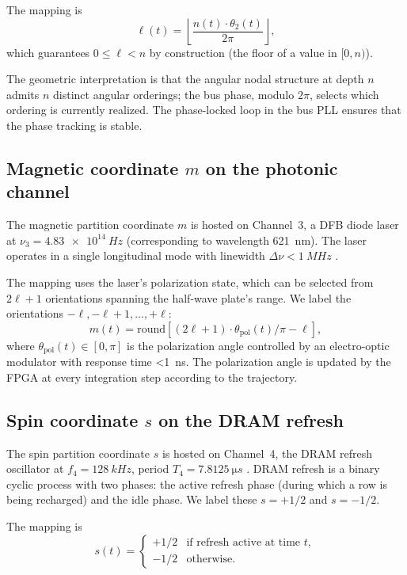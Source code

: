 \documentclass[twocolumn,11pt,a4paper]{article}
\theoremstyle{definition}
\theoremstyle{remark}
\begin{document}
The mapping is
\begin{equation}
    \ell(t) = \left\lfloor \frac{n(t) \cdot \theta_2(t)}{2\pi} \right\rfloor,
    \label{eq:l-map}
\end{equation}
which guarantees $0 \le \ell < n$ by construction (the floor of a value in $[0, n)$).

The geometric interpretation is that the angular nodal structure at depth $n$ admits $n$ distinct angular orderings; the bus phase, modulo $2\pi$, selects which ordering is currently realized. The phase-locked loop in the bus PLL ensures that the phase tracking is stable.

\subsection{Magnetic coordinate $m$ on the photonic channel}

The magnetic partition coordinate $m$ is hosted on Channel~3, a DFB diode laser at $\nu_3 = \SI{4.83e14}{Hz}$ (corresponding to wavelength \SI{621}{nm}). The laser operates in a single longitudinal mode with linewidth $\Delta\nu < \SI{1}{MHz}$ \citep{coldren2012}.

The mapping uses the laser's polarization state, which can be selected from $2\ell + 1$ orientations spanning the half-wave plate's range. We label the orientations $-\ell, -\ell+1, \ldots, +\ell$:
\begin{equation}
    m(t) = \mathrm{round}\!\left[(2\ell + 1) \cdot \theta_{\mathrm{pol}}(t)/\pi - \ell\right],
\end{equation}
where $\theta_{\mathrm{pol}}(t) \in [0, \pi]$ is the polarization angle controlled by an electro-optic modulator with response time \SI{<1}{ns}. The polarization angle is updated by the FPGA at every integration step according to the trajectory.

\subsection{Spin coordinate $s$ on the DRAM refresh}

The spin partition coordinate $s$ is hosted on Channel~4, the DRAM refresh oscillator at $f_4 = \SI{128}{kHz}$, period $T_4 = \SI{7.8125}{\micro s}$ \citep{liu2012}. DRAM refresh is a binary cyclic process with two phases: the active refresh phase (during which a row is being recharged) and the idle phase. We label these $s = +1/2$ and $s = -1/2$.

The mapping is
\begin{equation}
    s(t) = \begin{cases} +1/2 & \text{if refresh active at time } t, \\ -1/2 & \text{otherwise.}\end{cases}
\end{equation}
\end{document}
